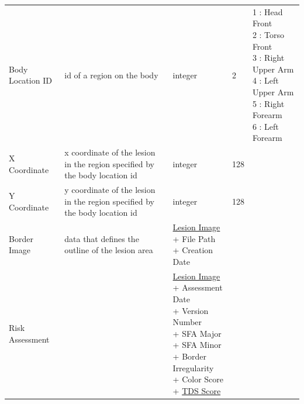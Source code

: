 \begin{longtable}[H]{ | l | p{3.0cm} | p{2.5cm} | p{1.0cm} | p{2.5cm} | }
                     & & \\ \hline


                    Body Location ID & id of a region on the body &
                    integer & 2 &

                        \specialcell[t]{
                            1 : Head Front \\
                            2 : Torso Front \\
                            3 : Right Upper Arm \\
                            4 : Left Upper Arm \\
                            5 : Right Forearm \\
                            6 : Left Forearm \\

                        }

                     \\ \hline

                    X Coordinate & x coordinate of the lesion in the region specified by the body location id &
                    integer & 128 &  \\ \hline

                    Y Coordinate & y coordinate of the lesion in the region specified by the body location id &
                    integer & 128 &  \\ \hline

                    Border Image & data that defines the outline of the lesion area &

                        \specialcell[t]{\hyperlink{lesion_image}{Lesion Image}
                           \\ + File Path
                           \\ + Creation Date
                        }

                     & & \\ \hline

                    Risk Assessment &  &

                        \specialcell[t]{\hyperlink{lesion_image}{Lesion Image}
                            \\ + Assessment Date
                            \\ + Version Number
                            \\ + SFA Major
                            \\ + SFA Minor
                            \\ + Border Irregularity
                            \\ + Color Score
                            \\ + \hyperlink{tds_score}{TDS Score}
                        }


\end{longtable}
